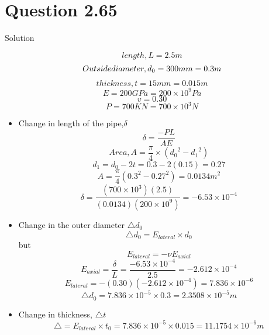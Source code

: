 \documentclass{article}
\begin{document}
\section*{Question 2.65}
\begin{center} Solution\end{center}
\[length, L = 2.5m\]
\[Outside\space diameter, d_{0} = 300mm = 0.3m\]
\[thickness, t =15mm = 0.015m\]
\[E = 200GPa = 200\times10^{9}Pa\]
\[v=0.30\]
\[P = 700KN = 700\times10^{3}N\]
\begin{itemize}
\item Change in length of the pipe,$\delta$
\[\delta  = \frac{-PL}{AE}\]
\[Area, A = \frac{\pi}{4}\times({{d_{0}}^{2}} - {{d_{1}}^{2}})\]
\[d_{1} = d_{0} - 2t = 0.3-2(0.15)=0.27\]
\[A = \frac{\pi}{4}(0.3^{2} - 0.27^{2}) = 0.0134m^{2}\]
\[\delta = \frac{(700\times10^{3})(2.5)}{(0.0134)(200\times10^{9})} = -6.53\times10^{-4}\]
\item Change in the outer diameter $\triangle d_{0}$
\[\triangle d_{0} = E_{lateral} \times d_{0}\]
but 
\[E_{lateral} = -\nu E_{axial}\]
\[E_{axial} = \frac{\delta}{L} = \frac{-6.53\times 10^{-4}}{2.5}=-2.612\times10^{-4}\]
\[E_{lateral} = -(0.30)(-2.612\times10^{-4}) = 7.836\times10^{-6}\]
\[\triangle d_{0} = 7.836\times10^{-5}\times0.3=2.3508\times10^{-5}m\]
\item Change in thickness, $\triangle t$
\[\triangle = E_{lateral} \times t_{0}= 7.836\times10^{-5}\times0.015=11.1754\times10^{-6}m\]

\end{itemize}

\end{document}
